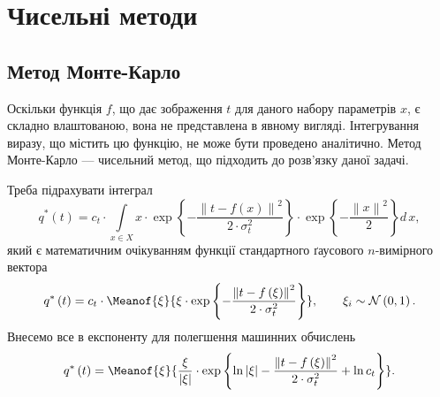 \section{Чисельні методи}

\subsection{Метод Монте-Карло}

Оскільки функція $f$, що дає зображення $t$ для даного набору параметрів $x$,
є складно влаштованою, вона не представлена в явному вигляді.
Інтегрування виразу, що містить цю функцію, не може бути проведено аналітично.
Метод Монте-Карло --- чисельний метод, що підходить до розв'язку даної задачі.

Треба підрахувати інтеграл
\begin{equation*}
  q^* \left( t \right)
  = c_t
    \cdot \int\limits_{x \in X}
      x
      \cdot \exp{\left\{ - \frac{\left\| t - f\left( x \right) \right\|^2}
                                {2 \cdot \sigma^2_t}\right\}}
      \cdot \exp{\left\{ - \frac{\left\| x \right\|^2}{2} \right\}}
    d\,x,
\end{equation*}
який є математичним очікуванням функції
стандартного ґаусового $n$-вимірного вектора
\begin{equation*}
  q^* \left( t \right)
  = c_t
    \cdot \Meanof{\xi}{
      \xi
      \cdot \exp{\left\{
          - \frac{\left\| t - f\left( \xi \right) \right\|^2}
                 {2 \cdot \sigma^2_t}
            \right\}}}, \qquad
    \xi_i \sim \mathcal{N}\left( 0, 1 \right).
\end{equation*}
Внесемо все в експоненту для полегшення машинних обчислень
\begin{equation*}
  q^* \left( t \right)
  = \Meanof{\xi}{
    \frac{\xi}{\left| \xi \right|}
    \cdot \exp{\left\{
        \ln{\left| \xi \right|}
        - \frac{\left\| t - f\left( \xi \right) \right\|^2}{2 \cdot \sigma^2_t}
        + \ln{c_t}
       \right\}
    }}.
\end{equation*}


